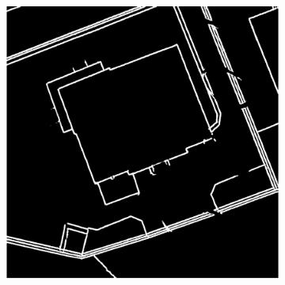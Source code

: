 \documentclass[12pt]{article}
\begin{document}
\begin{figure}[H]
\begin{subfigure}[b]{.28\textwidth}
\begin{minipage}[t]{1\linewidth}
		\end{minipage}
	\end{subfigure}
	\begin{subfigure}[b]{.28\textwidth}
		\begin{minipage}[t]{1\linewidth}
			\centering
			\includegraphics[width=1\linewidth]{images/patches/pre7.png}
		\end{minipage}
	\end{subfigure}

	\vspace{+2mm}
    \setcounter{subfigure}{0}
	
	
	
	
 
    \begin{subfigure}[b]{.28\textwidth}
		

\end{subfigure}
\end{figure}
\end{document}
